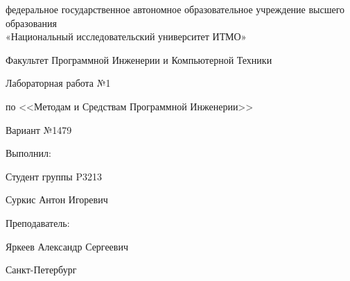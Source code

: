 \begin{titlepage}
    \begin{center}
        федеральное государственное автономное образовательное учреждение высшего образования\\
        «Национальный исследовательский университет ИТМО»

        \bigskip

        Факультет Программной Инженерии и Компьютерной Техники

        \vfill

        {\Large
        Лабораторная работа №1

        по <<Методам и Средствам Программной Инженерии>>

        \bigskip

        Вариант №1479
        }
    \end{center}

    \bigskip

    \begin{flushright}
        Выполнил:

        Студент группы P3213

        Суркис Антон Игоревич

        Преподаватель:

        Яркеев Александр Сергеевич
    \end{flushright}

    \vfill

    \begin{center}
        Санкт-Петербург

        \the\year
    \end{center}


\end{titlepage}
